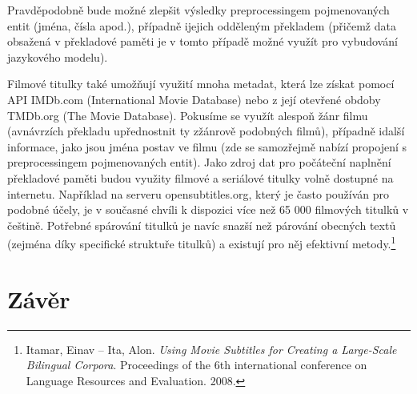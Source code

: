 Pravděpodobně bude možné zlepšit výsledky preprocessingem pojmenovaných entit (jména, čísla apod.), případně ijejich odděleným překladem (přičemž data obsažená v překladové paměti je v tomto případě možné využít pro vybudování jazykového modelu).

Filmové titulky také umožňují využití mnoha metadat, která lze získat pomocí API IMDb.com (International Movie Database) nebo z její otevřené obdoby TMDb.org (The Movie Database). Pokusíme se využít alespoň žánr filmu (avnávrzích překladu upřednostnit ty zžánrově podobných filmů), případně idalší informace, jako jsou jména postav ve filmu (zde se samozřejmě nabízí propojení s preprocessingem pojmenovaných entit).
Jako zdroj dat pro počáteční naplnění překladové paměti budou využity filmové a seriálové titulky volně dostupné na internetu. Například na serveru opensubtitles.org, který je často používán pro podobné účely, je v současné chvíli k dispozici více než 65 000 filmových titulků v češtině. Potřebné spárování titulků je navíc snazší než párování obecných textů (zejména díky specifické struktuře titulků) a existují pro něj efektivní metody.\footnote{Itamar, Einav – Ita, Alon. \emph{Using Movie Subtitles for Creating a Large-Scale Bilingual Corpora}. Proceedings of the 6th international conference on Language Resources and Evaluation. 2008.}

\section{Závěr}